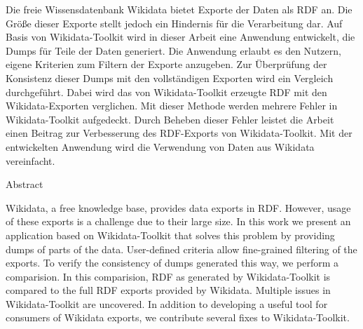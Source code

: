%
\label{sec:abstract}
Die freie Wissensdatenbank Wikidata bietet Exporte der Daten als RDF an.
Die Größe dieser Exporte stellt jedoch ein Hindernis für die Verarbeitung dar.
Auf Basis von Wikidata-Toolkit wird in dieser Arbeit eine Anwendung entwickelt, die Dumps für Teile der Daten generiert.
Die Anwendung erlaubt es den Nutzern, eigene Kriterien zum Filtern der Exporte anzugeben.
Zur Überprüfung der Konsistenz dieser Dumps mit den vollständigen Exporten wird ein Vergleich durchgeführt.
Dabei wird das von Wikidata-Toolkit erzeugte RDF mit den Wikidata-Exporten verglichen.
Mit dieser Methode werden mehrere Fehler in Wikidata-Toolkit aufgedeckt.
Durch Beheben dieser Fehler leistet die Arbeit einen Beitrag zur Verbesserung des RDF-Exports von Wikidata-Toolkit.
Mit der entwickelten Anwendung wird die Verwendung von Daten aus Wikidata vereinfacht.

\vspace*{20mm}

{Abstract}
\label{sec:abstract-diff}

Wikidata, a free knowledge base, provides data exports in RDF.
However, usage of these exports is a challenge due to their large size.
In this work we present an application based on Wikidata-Toolkit that solves this problem by providing dumps of parts of the data.
User-defined criteria allow fine-grained filtering of the exports.
To verify the consistency of dumps generated this way, we perform a comparision.
In this comparision, RDF as generated by Wikidata-Toolkit is compared to the full RDF exports provided by Wikidata.
Multiple issues in Wikidata-Toolkit are uncovered.
In addition to developing a useful tool for consumers of Wikidata exports, we contribute several fixes to Wikidata-Toolkit.